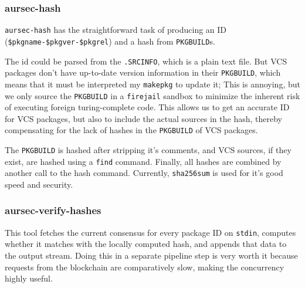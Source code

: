 \subsubsection{aursec-hash}
\texttt{aursec-hash} has the straightforward task of producing an ID (\texttt{\$pkgname-\$pkgver-\$pkgrel}) and a hash from \texttt{PKGBUILD}s.

The id could be parsed from the \texttt{.SRCINFO}, which is a plain text file.
But VCS packages don't have up-to-date version information in their \texttt{PKGBUILD}, which means that it must be interpreted my \texttt{makepkg} to update it; This is annoying, but we only source the \texttt{PKGBUILD} in a \texttt{firejail} sandbox to minimize the inherent risk of executing foreign turing-complete code.
This allows us to get an accurate ID for VCS packages, but also to include the actual sources in the hash, thereby compensating for the lack of hashes in the \texttt{PKGBUILD} of VCS packages.

The \texttt{PKGBUILD} is hashed after stripping it's comments, and VCS sources, if they exist, are hashed using a \texttt{find} command.
Finally, all hashes are combined by another call to the hash command.
Currently, \texttt{sha256sum} is used for it's good speed and security.

\subsubsection{aursec-verify-hashes}
This tool fetches the current consensus for every package ID on \texttt{stdin}, computes whether it matches with the locally computed hash, and appends that data to the output stream.
Doing this in a separate pipeline step is very worth it because requests from the blockchain are comparatively slow, making the concurrency highly useful.
